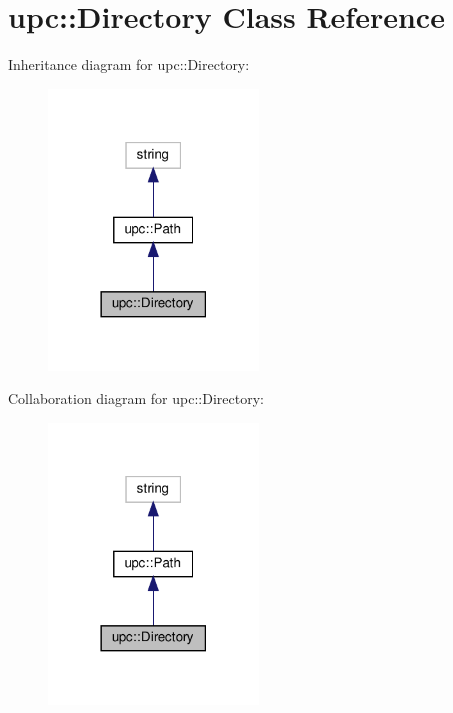 \hypertarget{classupc_1_1Directory}{}\section{upc\+:\+:Directory Class Reference}
\label{classupc_1_1Directory}


Inheritance diagram for upc\+:\+:Directory\+:
\nopagebreak
\begin{figure}[H]
\begin{center}
\leavevmode
\includegraphics[width=158pt]{classupc_1_1Directory__inherit__graph}
\end{center}
\end{figure}


Collaboration diagram for upc\+:\+:Directory\+:
\nopagebreak
\begin{figure}[H]
\begin{center}
\leavevmode
\includegraphics[width=158pt]{classupc_1_1Directory__coll__graph}
\end{center}
\end{figure}
